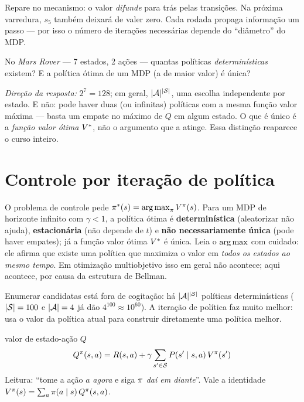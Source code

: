 \documentclass[11pt, a4paper]{article}
\begin{document}
\begin{ideiabox}
Repare no mecanismo: o valor \emph{difunde} para trás pelas transições. Na próxima
varredura, $s_5$ também deixará de valer zero. Cada rodada propaga informação um passo
--- por isso o número de iterações necessárias depende do ``diâmetro'' do MDP.
\end{ideiabox}

\begin{discbox}
No \emph{Mars Rover} --- 7 estados, 2 ações --- quantas políticas \emph{determinísticas}
existem? E a política ótima de um MDP (a de maior valor) é única?
\smallskip

\emph{Direção da resposta:} $2^7 = 128$; em geral, $\lvert\mathcal{A}\rvert^{\lvert\mathcal{S}\rvert}$, uma escolha
independente por estado. E não: pode haver duas (ou infinitas) políticas com a mesma
função valor máxima --- basta um empate no máximo de $Q$ em algum estado. O que é único
é a \emph{função valor ótima} $V^{*}$, não o argumento que a atinge. Essa distinção
reaparece o curso inteiro.
\end{discbox}

\section{Controle por iteração de política}

O problema de controle pede $\pi^{*}(s) = \operatorname*{arg\,max}_{\pi} V^{\pi}(s)$. Para um MDP de
horizonte infinito com $\gamma < 1$, a política ótima é \textbf{determinística}
(aleatorizar não ajuda), \textbf{estacionária} (não depende de $t$) e
\textbf{não necessariamente única} (pode haver empates); já a função valor ótima
$V^{*}$ é única. Leia o $\operatorname*{arg\,max}$ com cuidado: ele afirma que existe uma política que
maximiza o valor em \emph{todos os estados ao mesmo tempo}. Em otimização multiobjetivo
isso em geral não acontece; aqui acontece, por causa da estrutura de Bellman.

Enumerar candidatas está fora de cogitação: há $\lvert\mathcal{A}\rvert^{\lvert\mathcal{S}\rvert}$ políticas
determinísticas ($\lvert\mathcal{S}\rvert=100$ e $\lvert\mathcal{A}\rvert=4$ já dão $4^{100} \approx 10^{60}$). A
iteração de política faz muito melhor: usa o valor da política atual para construir
diretamente uma política melhor.

\begin{defbox}{valor de estado-ação $Q$}
\[
  Q^{\pi}(s,a) = R(s,a) + \gamma \sum_{s' \in \mathcal{S}} P(s'\mid s,a)\, V^{\pi}(s')
\]
Leitura: ``tome a ação $a$ \emph{agora} e siga $\pi$ \emph{daí em diante}''. Vale a
identidade $V^{\pi}(s) = \sum_a \pi(a \mid s)\, Q^{\pi}(s,a)$.
\end{defbox}
\end{document}
